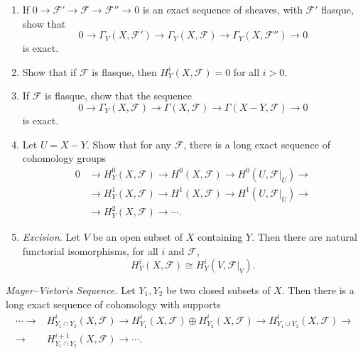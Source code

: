 {\begin{enumerate}[label=(\alph*),leftmargin=2.5em,itemsep=0pt,topsep=1pt,parsep=0pt]
We denote the right derived functors of $\Gamma_Y(X,\cdot)$ by $H_Y^i(X,\cdot)$. They are the \emph{cohomology groups of $X$ with supports in $Y$}, and coefficients in a given sheaf.
\item If $0\to\mathcal F'\to\mathcal F\to\mathcal F''\to0$ is an exact sequence of sheaves, with $\mathcal F'$ flasque, show that
\[
  0\to\Gamma_Y(X,\mathcal F')\to\Gamma_Y(X,\mathcal F)\to\Gamma_Y(X,\mathcal F'')\to0
\]
is exact.
\item Show that if $\mathcal F$ is flasque, then $H_Y^i(X,\mathcal F)=0$ for all $i>0$.
\item If $\mathcal F$ is flasque, show that the sequence
\[
  0\to\Gamma_Y(X,\mathcal F)\to\Gamma(X,\mathcal F)\to\Gamma(X-Y,\mathcal F)\to0
\]
is exact.
\item Let $U=X-Y$. Show that for any $\mathcal F$, there is a long exact sequence of cohomology groups
\[
\begin{aligned}
  0&\to H_Y^0(X,\mathcal F)\to H^0(X,\mathcal F)\to H^0(U,\mathcal F|_U)\to\\
   &\to H_Y^1(X,\mathcal F)\to H^1(X,\mathcal F)\to H^1(U,\mathcal F|_U)\to\\
   &\to H_Y^2(X,\mathcal F)\to\cdots.
\end{aligned}
\]
\item \emph{Excision.} Let $V$ be an open subset of $X$ containing $Y$. Then there are natural functorial isomorphisms, for all $i$ and $\mathcal F$,
\[
  H_Y^i(X,\mathcal F)\cong H_Y^i(V,\mathcal F|_V).
\]
\end{enumerate}

 \emph{Mayer--Vietoris Sequence.} Let $Y_1,Y_2$ be two closed subsets of $X$. Then there is a long exact sequence of cohomology with supports
\[
\begin{aligned}
  \cdots\to &H^i_{Y_1\cap Y_2}(X,\mathcal F)
  \to H^i_{Y_1}(X,\mathcal F)\oplus H^i_{Y_2}(X,\mathcal F)
  \to H^i_{Y_1\cup Y_2}(X,\mathcal F)\to\\
  \to &H^{i+1}_{Y_1\cap Y_2}(X,\mathcal F)\to\cdots.
\end{aligned}
\]
}
